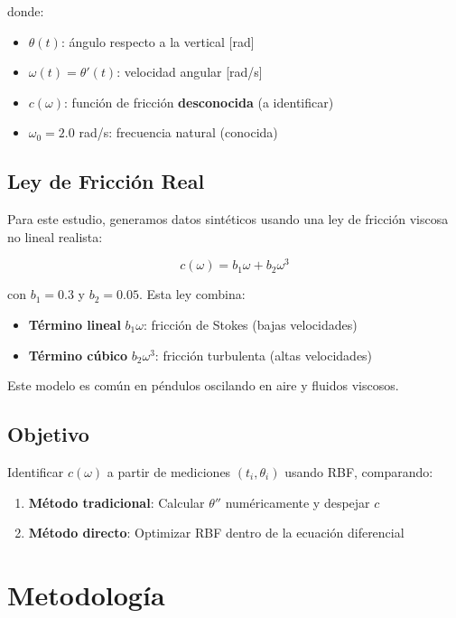 \documentclass[11pt,a4paper]{article}
\begin{document}
donde:
\begin{itemize}
\item $\theta(t)$: ángulo respecto a la vertical [rad]
\item $\omega(t) = \theta'(t)$: velocidad angular [rad/s]
\item $c(\omega)$: función de fricción \textbf{desconocida} (a identificar)
\item $\omega_0 = 2.0$ rad/s: frecuencia natural (conocida)
\end{itemize}

\subsection{Ley de Fricción Real}

Para este estudio, generamos datos sintéticos usando una ley de fricción viscosa no lineal realista:

\begin{equation}
c(\omega) = b_1 \omega + b_2 \omega^3
\end{equation}

con $b_1 = 0.3$ y $b_2 = 0.05$. Esta ley combina:
\begin{itemize}
\item \textbf{Término lineal} $b_1 \omega$: fricción de Stokes (bajas velocidades)
\item \textbf{Término cúbico} $b_2 \omega^3$: fricción turbulenta (altas velocidades)
\end{itemize}

Este modelo es común en péndulos oscilando en aire y fluidos viscosos.

\subsection{Objetivo}

Identificar $c(\omega)$ a partir de mediciones $(t_i, \theta_i)$ usando RBF, comparando:
\begin{enumerate}
\item \textbf{Método tradicional}: Calcular $\theta''$ numéricamente y despejar $c$
\item \textbf{Método directo}: Optimizar RBF dentro de la ecuación diferencial
\end{enumerate}

\section{Metodología}
\end{document}
